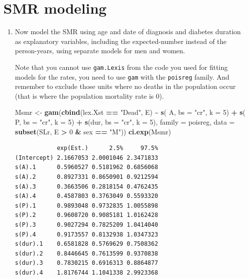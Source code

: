 \documentclass[
]{book}
\newenvironment{Shaded}{\begin{snugshade}}{\end{snugshade}}
\newcommand{\AttributeTok}[1]{\textcolor[rgb]{0.13,0.29,0.53}{#1}}
\newcommand{\DecValTok}[1]{\textcolor[rgb]{0.00,0.00,0.81}{#1}}
\newcommand{\FunctionTok}[1]{\textcolor[rgb]{0.13,0.29,0.53}{\textbf{#1}}}
\newcommand{\NormalTok}[1]{#1}
\newcommand{\OtherTok}[1]{\textcolor[rgb]{0.56,0.35,0.01}{#1}}
\newcommand{\SpecialCharTok}[1]{\textcolor[rgb]{0.81,0.36,0.00}{\textbf{#1}}}
\newcommand{\StringTok}[1]{\textcolor[rgb]{0.31,0.60,0.02}{#1}}
\begin{document}
\section{SMR modeling}\label{smr-modeling}

\begin{enumerate}
\def\labelenumi{\arabic{enumi}.}
\setcounter{enumi}{13}
\item
  Now model the SMR using age and date of diagnosis and diabetes
  duration as explanatory variables, including the expected-number
  instead of the person-years, using separate models for
  men and women.

  Note that you cannot use \texttt{gam.Lexis} from the code you used for
  fitting models for the rates, you need to use \texttt{gam} with
  the \texttt{poisreg} family. And remember to exclude those units
  where no deaths in the population occur (that is where the
  population mortality rate is 0).

\begin{Shaded}
\begin{Highlighting}[]
\NormalTok{Msmr }\OtherTok{\textless{}{-}} \FunctionTok{gam}\NormalTok{(}\FunctionTok{cbind}\NormalTok{(lex.Xst }\SpecialCharTok{==} \StringTok{"Dead"}\NormalTok{, E) }
            \SpecialCharTok{\textasciitilde{}} \FunctionTok{s}\NormalTok{(  A, }\AttributeTok{bs =} \StringTok{"cr"}\NormalTok{, }\AttributeTok{k =} \DecValTok{5}\NormalTok{) }\SpecialCharTok{+}
              \FunctionTok{s}\NormalTok{(  P, }\AttributeTok{bs =} \StringTok{"cr"}\NormalTok{, }\AttributeTok{k =} \DecValTok{5}\NormalTok{) }\SpecialCharTok{+}
              \FunctionTok{s}\NormalTok{(dur, }\AttributeTok{bs =} \StringTok{"cr"}\NormalTok{, }\AttributeTok{k =} \DecValTok{5}\NormalTok{),}
            \AttributeTok{family =}\NormalTok{ poisreg,}
              \AttributeTok{data =} \FunctionTok{subset}\NormalTok{(SLr, E }\SpecialCharTok{\textgreater{}} \DecValTok{0} \SpecialCharTok{\&}\NormalTok{ sex }\SpecialCharTok{==} \StringTok{"M"}\NormalTok{))}
\FunctionTok{ci.exp}\NormalTok{(Msmr)}
\end{Highlighting}
\end{Shaded}

\begin{verbatim}
            exp(Est.)      2.5%     97.5%
(Intercept) 2.1667053 2.0001046 2.3471833
s(A).1      0.5960527 0.5181962 0.6856068
s(A).2      0.8927331 0.8650901 0.9212594
s(A).3      0.3663506 0.2818154 0.4762435
s(A).4      0.4587803 0.3763049 0.5593320
s(P).1      0.9893048 0.9732835 1.0055898
s(P).2      0.9608720 0.9085181 1.0162428
s(P).3      0.9027294 0.7825209 1.0414040
s(P).4      0.9173557 0.8132938 1.0347323
s(dur).1    0.6581828 0.5769629 0.7508362
s(dur).2    0.8446645 0.7613599 0.9370838
s(dur).3    0.7830215 0.6916313 0.8864877
s(dur).4    1.8176744 1.1041338 2.9923368
\end{verbatim}


\end{enumerate}
\end{document}
